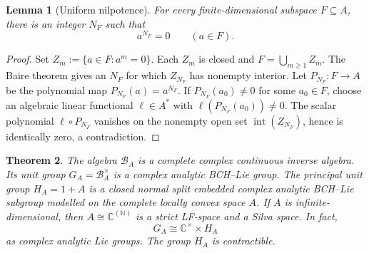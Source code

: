 \documentclass[11pt]{article}
\newtheorem{theorem}{Theorem}[section]
\newtheorem{lemma}[theorem]{Lemma}
\theoremstyle{remark}
\begin{document}
\begin{lemma}[Uniform nilpotence]
\label{lem:uniform-nilpotence}
For every finite-dimensional subspace $F\subseteq A$, there is an integer
$N_F$ such that
\[
  a^{N_F}=0
  \qquad(a\in F).
\]
\end{lemma}

\begin{proof}
Set $Z_m:=\{a\in F:a^m=0\}$.  Each $Z_m$ is closed and
$F=\bigcup_{m\geq1}Z_m$.  The Baire theorem gives an $N_F$ for which
$Z_{N_F}$ has nonempty interior.  Let $P_{N_F}:F\to A$ be the polynomial map
$P_{N_F}(a)=a^{N_F}$.  If $P_{N_F}(a_0)\neq0$ for some $a_0\in F$, choose an
algebraic linear functional $\ell\in A^*$ with
$\ell(P_{N_F}(a_0))\neq0$.  The scalar polynomial $\ell\circ P_{N_F}$
vanishes on the nonempty open set $\operatorname{int}(Z_{N_F})$, hence is
identically zero, a contradiction.
\end{proof}

\begin{theorem}
\label{thm:cia-and-principal}
The algebra $\mathcal B_A$ is a complete complex continuous inverse algebra.
Its unit group $G_A=\mathcal B_A^\times$ is a complex analytic BCH--Lie group.
The principal unit group $H_A=1+A$ is a closed normal split embedded complex
analytic BCH--Lie subgroup modelled on the complete locally convex space $A$.
If $A$ is infinite-dimensional, then $A\cong\mathbb{C}^{(\mathbb{N})}$ is a strict
LF-space and a Silva space.  In fact,
\[
  G_A\cong\mathbb C^\times\times H_A
\]
as complex analytic Lie groups.  The group $H_A$ is contractible.
\end{theorem}
\end{document}
